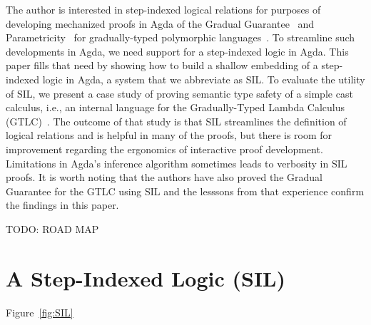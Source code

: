 \documentclass[acmsmall]{acmart}
\begin{document}
The author is interested in step-indexed logical relations for
purposes of developing mechanized proofs in Agda of the Gradual
Guarantee~\citep{Siek:2015ac} and Parametricity~\citep{REYNOLDS74C}
for gradually-typed polymorphic
languages~\citep{Ahmed:2011fk,Ahmed:2017aa,Igarashi:2017aa,New:2019ab,Labrada:2020tk}.
To streamline such developments in Agda, we need support for a
step-indexed logic in Agda. This paper fills that need by showing how
to build a shallow embedding of a step-indexed logic in Agda, a system
that we abbreviate as SIL. To evaluate the utility of SIL, we present
a case study of proving semantic type safety of a simple cast
calculus, i.e., an internal language for the Gradually-Typed Lambda
Calculus (GTLC)~\citep{Siek:2006bh,Siek:2007qy}. The outcome of that
study is that SIL streamlines the definition of logical relations and
is helpful in many of the proofs, but there is room for improvement
regarding the ergonomics of interactive proof development.
Limitations in Agda's inference algorithm sometimes leads to verbosity
in SIL proofs. It is worth noting that the authors have also proved
the Gradual Guarantee for the GTLC using SIL and the lesssons from
that experience confirm the findings in this paper.

TODO: ROAD MAP


\section{A Step-Indexed Logic (SIL)}

Figure~\ref{fig:SIL}
\end{document}
